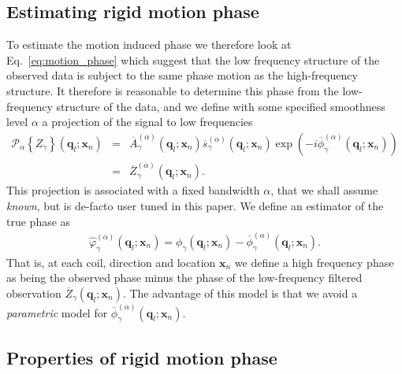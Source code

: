 \documentclass[authoryear,preprint,12pt]{elsarticle}
\newcommand{\q}{\mathbf{q}}
\newcommand{\x}{\mathbf{x}}
\newcommand{\cP}{\mathcal{P}}
\newcommand{\ol}[1]{\overline{#1}}
\begin{document}
\subsection{Estimating rigid motion phase}
\label{Est_rigid}

To estimate the motion induced phase we therefore look at
Eq.~\eqref{eq:motion_phase} which suggest that the low frequency
structure of the observed data is subject to the same phase motion as
the high-frequency structure.  It therefore is reasonable to determine
this phase from the low-frequency structure of the data, and we define
with some specified smoothness level $\alpha$ a projection of the
signal to low frequencies
\begin{eqnarray*}
  \cP_{\alpha}\left\{Z_{\gamma}\right\}(\q_l;\x_n) &=&
  \ol{A}_{\gamma}^{(\alpha)}(\q_l;\x_n)
  \ol{s}_{\gamma}^{(\alpha)}(\q_l;\x_n)
  \exp\left(-i\ol{\phi}_{\gamma}^{(\alpha)}(\q_l;\x_n)\right)\\
  &=& \ol{Z}_{\gamma}^{(\alpha)}(\q_l;\x_n).
\end{eqnarray*}
This projection is associated with a fixed bandwidth $\alpha$, that we
shall assume \textit{known}, but is de-facto user tuned in this paper.
We define an estimator of the true phase as
\begin{eqnarray}
  \hat{\varphi}_{\gamma}^{(\alpha)}(\q_l;\x_n) = \phi_{\gamma}(\q_l;\x_n) -
  \ol{\phi}_{\gamma}^{(\alpha)}(\q_l;\x_n).
\end{eqnarray}
That is, at each coil, direction and location $\x_n$ we define a high
frequency phase as being the observed phase minus the phase of the
low-frequency filtered observation $\ol{Z}_{\gamma}(\q_l;\x_n)$.  The
advantage of this model is that we avoid a {\em parametric} model for
$\ol{\phi}_{\gamma}^{(\alpha)}(\q_l;\x_n)$.

\subsection{Properties of rigid motion phase}
\label{PropRigidPhase}
\end{document}

